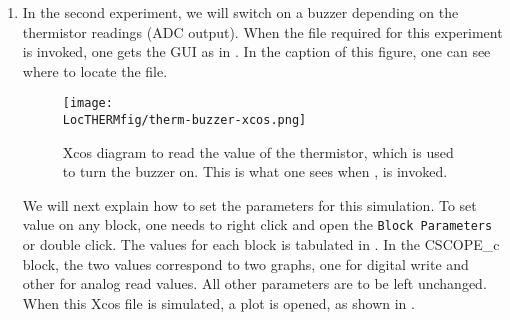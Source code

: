 \begin{enumerate}
  \item In the second experiment, we will switch on a buzzer
        depending on the thermistor readings (ADC output).
        When the file required for this
        experiment is invoked, one gets the GUI as in .
        In the caption of this figure, one can see where to locate the file.

        \begin{figure}
          \centering
          \texttt{[image: \\LocTHERMfig/therm-buzzer-xcos.png]}
          \caption[Xcos diagram to read the value of thermistor, which is
            used to turn the buzzer on] {Xcos diagram to read the value
            of the thermistor, which is used to turn the buzzer on.
            This is what one sees when
            , is invoked.}
          \label{fig:therm-buzzer}
        \end{figure}

        We will next explain how to set the parameters for this simulation.
        To set value on any block, one needs to right click and open the
          {\tt Block Parameters} or double click.  The values for each block
        is tabulated in .  In the CSCOPE\_c block, the
        two values correspond to two graphs, one for digital write and other
        for analog read values. All other parameters are to be left
        unchanged. When this Xcos file is simulated, a plot is opened,
        as shown in .


\end{enumerate}
